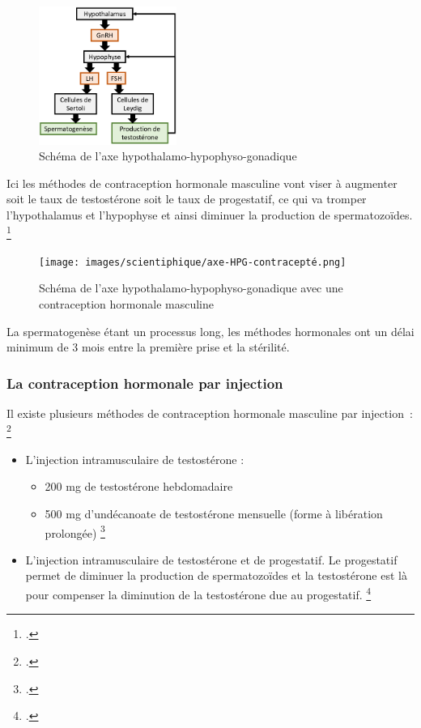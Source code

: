 \documentclass[12pt,a4paper]{report}
\begin{document}
\begin{figure}[!htb]
    \centering
    \includegraphics[width=0.4\textwidth]{images/scientiphique/axe-HPG.png}
    \caption{Schéma de l'axe hypothalamo-hypophyso-gonadique}
    \label{fig:axe-hypothalamo-hypophyso-gonadique}
\end{figure}

Ici les méthodes de contraception hormonale masculine vont viser à augmenter soit le taux de testostérone soit le taux de progestatif, ce qui va tromper l'hypothalamus et l'hypophyse et ainsi diminuer la production de spermatozoïdes. \footcite{abbeMaleContraception2020}

\begin{figure}[!htb]
    \centering
    \texttt{[image: images/scientiphique/axe-HPG-contracepté.png]}
    \caption{Schéma de l'axe hypothalamo-hypophyso-gonadique avec une contraception hormonale masculine}
    \label{fig:axe-hypothalamo-hypophyso-gonadique-contracepte}
\end{figure}

La spermatogenèse étant un processus long, les méthodes hormonales ont un délai minimum de 3 mois entre la première prise et la stérilité. 

\subsubsection{La contraception hormonale par injection}

Il existe plusieurs méthodes de contraception hormonale masculine par injection : \footcite{tcherdukianContraceptionMasculineQuelles2020}
\begin{itemize}
    \item L'injection intramusculaire de testostérone :
    \begin{itemize}
        \item 200 mg de testostérone hebdomadaire 
        \item 500 mg d’undécanoate de testostérone mensuelle (forme à libération prolongée) \footcite{tcherdukianContraceptionMasculineQuelles2020}
    \end{itemize}
    \item L'injection intramusculaire de testostérone et de progestatif. Le progestatif permet de diminuer la production de spermatozoïdes et la testostérone est là pour compenser la diminution de la testostérone due au progestatif. \footcite{longUpdateNovelHormonal2021}
\end{itemize}
\end{document}
